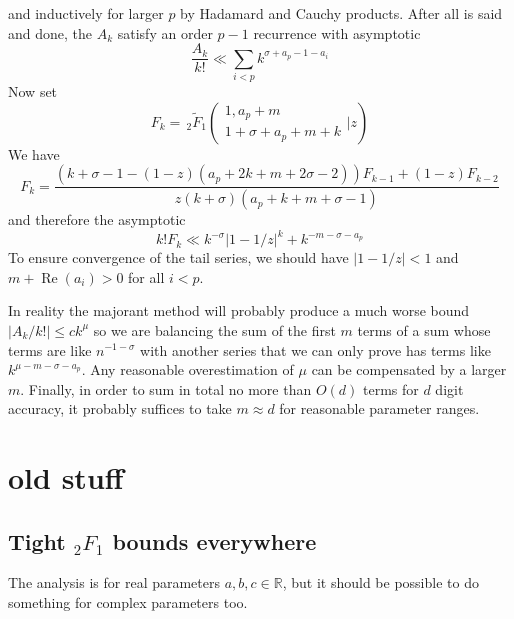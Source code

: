 \documentclass[10pt]{article}
\begin{document}
and inductively for larger $p$ by Hadamard and Cauchy products. After all is said and done, the $A_k$ satisfy an order $p-1$ recurrence with asymptotic
\begin{equation}
\frac{A_k}{k!} \ll \sum_{i<p}k^{\sigma+a_p-1-a_i}
\end{equation}
Now set
\begin{equation*}
F_k = \, _2\tilde{F}_1\left( \begin{array}{c} 1,a_p+m \\ 1+\sigma+a_p+m+k \end{array} \Big| z\right)
\end{equation*}
We have
\begin{equation*}
F_k=\frac{\left(k+\sigma -1 - (1-z) \left(a_p+2 k+m+2 \sigma
   -2\right)\right) F_{k-1} +(1-z) F_{k-2}}{z (k+\sigma )
   \left(a_p+k+m+\sigma -1\right)}
\end{equation*}
and therefore the asymptotic
\begin{equation*}
k!F_k \ll k^{-\sigma} \left|1-1/z\right|^k + k^{-m-\sigma-a_p}
\end{equation*}
To ensure convergence of the tail series, we should have
$|1-1/z|<1$ and $m+\operatorname{Re}(a_i)>0$ for all $i<p$.

In reality the majorant method will probably produce a much worse bound $|A_k/k!| \le c k^{\mu}$ so we are balancing the sum of the first $m$ terms of a sum whose terms are like $n^{-1-\sigma}$ with another series that we can only prove has terms like $k^{\mu-m-\sigma-a_p}$. Any reasonable overestimation of $\mu$ can be compensated by a larger $m$. Finally, in order to sum in total no more than $O(d)$ terms for $d$ digit accuracy, it probably suffices to take $m \approx d$ for reasonable parameter ranges.

\section{old stuff}
\subsection{Tight ${}_2 F_1$ bounds everywhere}
The analysis is for real parameters $a,b,c \in \mathbb{R}$, but it should be possible to do something for complex parameters too.
\end{document}
